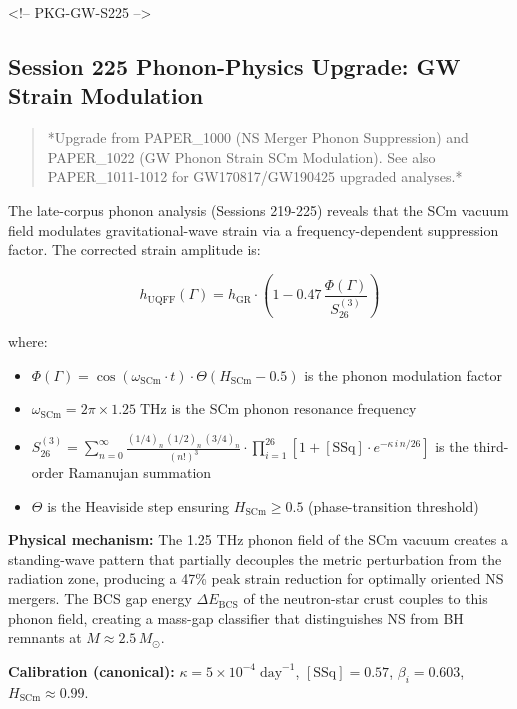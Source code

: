 \documentclass[11pt]{article}
\begin{document}
<!-- PKG-GW-S225 -->

\subsection*{Session 225 Phonon-Physics Upgrade: GW Strain Modulation}

\begin{quote}
*Upgrade from PAPER\_1000 (NS Merger Phonon Suppression) and PAPER\_1022
(GW Phonon Strain SCm Modulation). See also PAPER\_1011-1012 for
GW170817/GW190425 upgraded analyses.*
\end{quote}

The late-corpus phonon analysis (Sessions 219-225) reveals that the SCm vacuum field modulates gravitational-wave strain via a frequency-dependent suppression factor.  The corrected strain amplitude is:

$$h_{\text{UQFF}}(\Gamma) = h_{\text{GR}} \cdot \left(1 - 0.47\,\frac{\Phi(\Gamma)}{S_{26}^{(3)}}\right)$$

where:

\begin{itemize}
  \item $\Phi(\Gamma) = \cos(\omega_{\text{SCm}} \cdot t) \cdot \Theta(H_{\text{SCm}} - 0.5)$ is the phonon modulation factor
  \item $\omega_{\text{SCm}} = 2\pi \times 1.25\;\text{THz}$ is the SCm phonon resonance frequency
  \item $S_{26}^{(3)} = \sum_{n=0}^{\infty} \frac{(1/4)_n\,(1/2)_n\,(3/4)_n}{(n!)^3} \cdot \prod_{i=1}^{26}\left[1 + [\text{SSq}]\cdot e^{-\kappa\,i\,n/26}\right]$ is the third-order Ramanujan summation
  \item $\Theta$ is the Heaviside step ensuring $H_{\text{SCm}} \geq 0.5$ (phase-transition threshold)
\end{itemize}

\textbf{Physical mechanism:} The 1.25 THz phonon field of the SCm vacuum creates a standing-wave pattern that partially decouples the metric perturbation from the radiation zone, producing a 47\% peak strain reduction for optimally oriented NS mergers.  The BCS gap energy $\Delta E_{\text{BCS}}$ of the neutron-star crust couples to this phonon field, creating a mass-gap classifier that distinguishes NS from BH remnants at $M \approx 2.5\,M_\odot$.

\textbf{Calibration (canonical):} $\kappa = 5 \times 10^{-4}\;\text{day}^{-1}$, $[\text{SSq}] = 0.57$, $\beta_i = 0.603$, $H_{\text{SCm}} \approx 0.99$.
\end{document}

